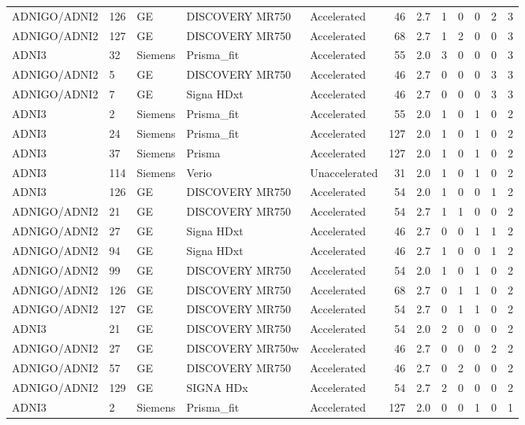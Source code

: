 \documentclass{article}
\begin{document}
\begin{landscape}
\begin{longtable}{lllllrrrrrrr}
ADNIGO/ADNI2 & 126 & GE & DISCOVERY MR750 & Accelerated & 46 & 2.7 & 1 & 0 & 0 & 2 & 3 \\
ADNIGO/ADNI2 & 127 & GE & DISCOVERY MR750 & Accelerated & 68 & 2.7 & 1 & 2 & 0 & 0 & 3 \\
ADNI3 & 32 & Siemens & Prisma\_fit & Accelerated & 55 & 2.0 & 3 & 0 & 0 & 0 & 3 \\
ADNIGO/ADNI2 & 5 & GE & DISCOVERY MR750 & Accelerated & 46 & 2.7 & 0 & 0 & 0 & 3 & 3 \\
ADNIGO/ADNI2 & 7 & GE & Signa HDxt & Accelerated & 46 & 2.7 & 0 & 0 & 0 & 3 & 3 \\
ADNI3 & 2 & Siemens & Prisma\_fit & Accelerated & 55 & 2.0 & 1 & 0 & 1 & 0 & 2 \\
ADNI3 & 24 & Siemens & Prisma\_fit & Accelerated & 127 & 2.0 & 1 & 0 & 1 & 0 & 2 \\
ADNI3 & 37 & Siemens & Prisma & Accelerated & 127 & 2.0 & 1 & 0 & 1 & 0 & 2 \\
ADNI3 & 114 & Siemens & Verio & Unaccelerated & 31 & 2.0 & 1 & 0 & 1 & 0 & 2 \\
ADNI3 & 126 & GE & DISCOVERY MR750 & Accelerated & 54 & 2.0 & 1 & 0 & 0 & 1 & 2 \\
ADNIGO/ADNI2 & 21 & GE & DISCOVERY MR750 & Accelerated & 54 & 2.7 & 1 & 1 & 0 & 0 & 2 \\
ADNIGO/ADNI2 & 27 & GE & Signa HDxt & Accelerated & 46 & 2.7 & 0 & 0 & 1 & 1 & 2 \\
ADNIGO/ADNI2 & 94 & GE & Signa HDxt & Accelerated & 46 & 2.7 & 1 & 0 & 0 & 1 & 2 \\
ADNIGO/ADNI2 & 99 & GE & DISCOVERY MR750 & Accelerated & 54 & 2.0 & 1 & 0 & 1 & 0 & 2 \\
ADNIGO/ADNI2 & 126 & GE & DISCOVERY MR750 & Accelerated & 68 & 2.7 & 0 & 1 & 1 & 0 & 2 \\
ADNIGO/ADNI2 & 127 & GE & DISCOVERY MR750 & Accelerated & 54 & 2.7 & 0 & 1 & 1 & 0 & 2 \\
ADNI3 & 21 & GE & DISCOVERY MR750 & Accelerated & 54 & 2.0 & 2 & 0 & 0 & 0 & 2 \\
ADNIGO/ADNI2 & 27 & GE & DISCOVERY MR750w & Accelerated & 46 & 2.7 & 0 & 0 & 0 & 2 & 2 \\
ADNIGO/ADNI2 & 57 & GE & DISCOVERY MR750 & Accelerated & 46 & 2.7 & 0 & 2 & 0 & 0 & 2 \\
ADNIGO/ADNI2 & 129 & GE & SIGNA HDx & Accelerated & 54 & 2.7 & 2 & 0 & 0 & 0 & 2 \\
ADNI3 & 2 & Siemens & Prisma\_fit & Accelerated & 127 & 2.0 & 0 & 0 & 1 & 0 & 1 \\

\end{longtable}
\end{landscape}
\end{document}
